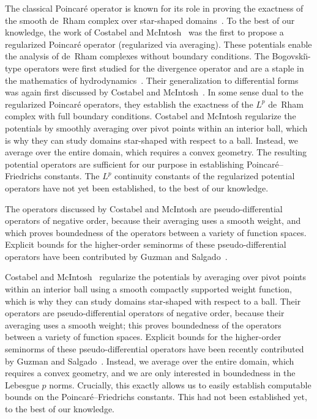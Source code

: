\documentclass[10pt,a4paper]{article}
\newcommand{\mwl}[1]{{\color{red}#1}}
\begin{document}
\begin{remark} \label{remark:reg_Poinc_Bog}
    The classical Poincar\'e operator is known for its role in proving the exactness of the smooth de~Rham complex over star-shaped domains~\cite{lee2012smooth}.
    To the best of our knowledge, the work of Costabel and McIntosh~\cite{costabel2010bogovskiui} was the first to propose a regularized Poincar\'e operator (regularized via averaging).
    These potentials enable the analysis of de~Rham complexes without boundary conditions.
    The Bogovski\u{\i}-type operators were first studied for the divergence operator and are a staple in the mathematics of hydrodynamics~\cite{bogovskii1979solution}.
    Their generalization to differential forms was again first discussed by Costabel and McIntosh~\cite{costabel2010bogovskiui}. 
    In some sense dual to the regularized Poincar\'e operators, they establish the exactness of the $L^{p}$ de~Rham complex with full boundary conditions.
    Costabel and McIntosh regularize the potentials by smoothly averaging over pivot points within an interior ball, 
    which is why they can study domains star-shaped with respect to a ball. 
    Instead, we average over the entire domain, which requires a convex geometry. 
    The resulting potential operators are sufficient for our purpose in establishing Poincar\'e--Friedrichs constants. 
    The $L^{p}$ continuity constants of the regularized potential operators have not yet been established, to the best of our knowledge.
    
    The operators discussed by Costabel and McIntosh are pseudo-differential operators of negative order, 
    because their averaging uses a smooth weight, and which proves boundedness of the operators between a variety of function spaces. 
    Explicit bounds for the higher-order seminorms of these pseudo-differential operators 
    have been contributed by Guzman and Salgado~\cite{guzman2021estimation}. %
    
    {\color{blue}
    Costabel and McIntosh~\cite{costabel2010bogovskiui} regularize the potentials by averaging over pivot points within an interior ball using a smooth compactly supported weight function, 
    which is why they can study domains star-shaped with respect to a ball. 
    Their operators are pseudo-differential operators of negative order, 
    because their averaging uses a smooth weight; this proves boundedness of the operators between a variety of function spaces. 
    Explicit bounds for the higher-order seminorms of these pseudo-differential operators 
    have been recently contributed by Guzman and Salgado~\cite{guzman2021estimation}. 
    Instead, we average over the entire domain, which requires a convex geometry, and we are only interested in boundedness in the Lebesgue $p$ norms. 
    Crucially, this exactly allows us to easily establish computable bounds on the Poincar\'e--Friedrichs constants.   
    This had not been established yet, to the best of our knowledge. 
    }
\end{remark}
\end{document}
